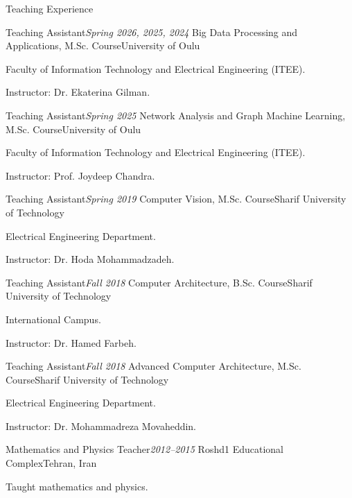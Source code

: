 \documentclass{resume}
\begin{document}
\begin{rSection}{Teaching Experience}
\vspace{+.1cm}

\begin{rSubsection}{Teaching Assistant}{\em Spring 2026, 2025, 2024}
{Big Data Processing and Applications, M.Sc. Course}{University of Oulu}
    \item Faculty of Information Technology and Electrical Engineering (ITEE).
    \item Instructor: Dr. Ekaterina Gilman.
\end{rSubsection}

\begin{rSubsection}{Teaching Assistant}{\em Spring 2025}
{Network Analysis and Graph Machine Learning, M.Sc. Course}{University of Oulu}
    \item Faculty of Information Technology and Electrical Engineering (ITEE).
    \item Instructor: Prof. Joydeep Chandra.
\end{rSubsection}

\begin{rSubsection}{Teaching Assistant}{\em Spring 2019}
{Computer Vision, M.Sc. Course}{Sharif University of Technology}
    \item Electrical Engineering Department.
    \item Instructor: Dr. Hoda Mohammadzadeh.
\end{rSubsection}

\begin{rSubsection}{Teaching Assistant}{\em Fall 2018}
{Computer Architecture, B.Sc. Course}{Sharif University of Technology}
    \item International Campus.
    \item Instructor: Dr. Hamed Farbeh.
\end{rSubsection}

\begin{rSubsection}{Teaching Assistant}{\em Fall 2018}
{Advanced Computer Architecture, M.Sc. Course}{Sharif University of Technology}
    \item Electrical Engineering Department.
    \item Instructor: Dr. Mohammadreza Movaheddin.
\end{rSubsection}

\begin{rSubsection}{Mathematics and Physics Teacher}{\em 2012--2015}
{Roshd1 Educational Complex}{Tehran, Iran}
    \item Taught mathematics and physics.
\end{rSubsection}

\end{rSection}
\end{document}
